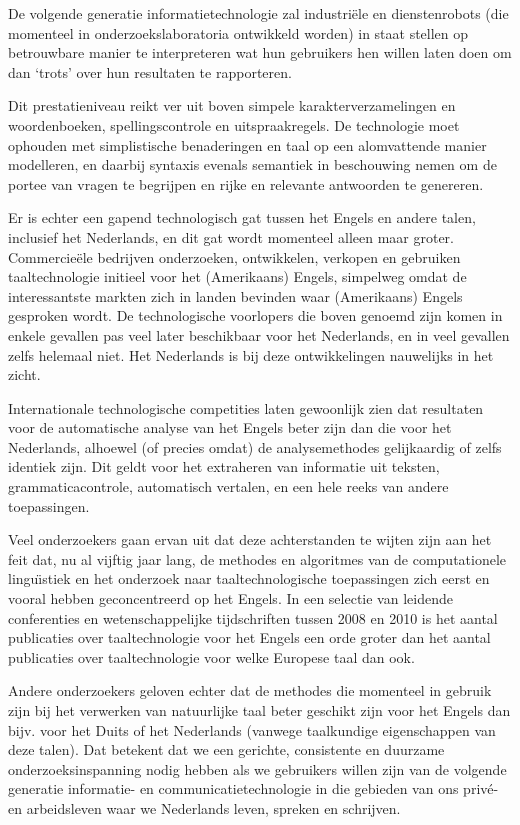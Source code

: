 \begin{multicols}{2}
De volgende generatie informatietechnologie zal industri{\"e}le en dienstenrobots (die momenteel in onderzoekslaboratoria ontwikkeld worden) in staat stellen op betrouwbare manier te interpreteren wat hun gebruikers hen willen laten doen om dan `trots' over hun resultaten te rapporteren.

Dit prestatieniveau reikt ver uit boven simpele karakterverzamelingen en woordenboeken, spellingscontrole en uitspraakregels. De technologie moet ophouden met simplistische benaderingen en taal op een alomvattende manier modelleren, en daarbij syntaxis evenals semantiek in beschouwing nemen om de portee van vragen te begrijpen en rijke en relevante antwoorden te genereren.

 Er is echter een gapend technologisch gat tussen het Engels en andere talen, inclusief het Nederlands, en dit gat wordt momenteel alleen maar groter. Commercie{\"e}le bedrijven onderzoeken, ontwikkelen, verkopen en gebruiken taaltechnologie initieel voor het (Amerikaans) Engels, simpelweg omdat de interessantste markten zich in landen bevinden waar (Amerikaans) Engels gesproken wordt. De technologische voorlopers die boven genoemd zijn komen in enkele gevallen pas veel later beschikbaar voor het Nederlands, en in veel gevallen zelfs helemaal niet. Het Nederlands is bij deze ontwikkelingen nauwelijks in het zicht.

Internationale  technologische competities laten gewoonlijk zien dat resultaten voor de automatische analyse van het Engels beter zijn dan die voor het Nederlands, alhoewel (of precies omdat) de analysemethodes gelijkaardig of zelfs identiek zijn. Dit geldt voor het extraheren van informatie uit teksten, grammaticacontrole, automatisch vertalen, en een hele reeks van andere toepassingen.

Veel onderzoekers gaan ervan uit dat deze achterstanden te wijten zijn aan het feit dat, nu al vijftig jaar lang, de methodes en algoritmes van de computationele lingu{\"\i}stiek en het onderzoek naar taaltechnologische toepassingen zich eerst en vooral hebben geconcentreerd op het Engels.  In een selectie van leidende conferenties en wetenschappelijke tijdschriften tussen 2008 en 2010 is het aantal publicaties over taaltechnologie voor het Engels een orde groter dan het aantal publicaties over taaltechnologie voor welke Europese taal dan ook.

Andere onderzoekers geloven echter dat de methodes die momenteel in gebruik zijn bij het verwerken van natuurlijke taal beter geschikt zijn voor het Engels dan bijv. voor het Duits of het Nederlands (vanwege taalkundige eigenschappen van deze talen). Dat betekent dat we een gerichte, consistente en duurzame onderzoeksinspanning nodig hebben als we gebruikers willen zijn van de volgende generatie informatie- en communicatietechnologie in die gebieden van ons priv{\'e}- en arbeidsleven waar we Nederlands leven, spreken en schrijven.


\end{multicols}
